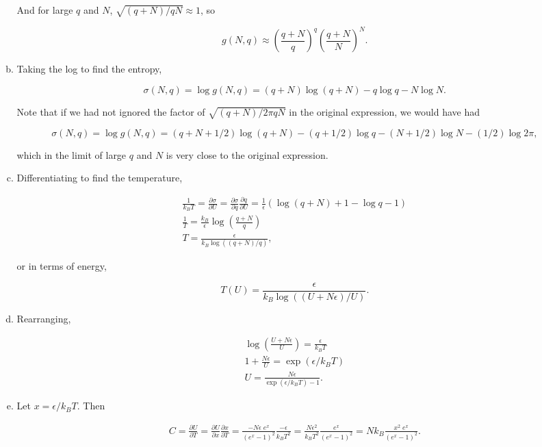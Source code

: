 \documentclass{article}
\begin{document}
\begin{enumerate}
\begin{enumerate}[(a)]
		And for large $q$ and $N$, $\sqrt{(q+N)/qN} \approx 1$, so

		$$g(N,q) \approx \left( \frac{q+N}{q} \right)^q \left( \frac{q+N}{N} \right)^N.$$

		\item

		Taking the log to find the entropy,

		$$
		\sigma(N, q) = \log g(N,q) = (q+N)\log (q+N) - q \log q - N \log N.
		$$

		Note that if we had not ignored the factor of $\sqrt{(q+N) / 2\pi qN}$ in the original expression, we would have had

		$$
		\sigma(N, q) = \log g(N,q) = (q+N + 1/2)\log (q+N) - (q + 1/2) \log q - (N + 1/2) \log N - (1/2) \log 2 \pi,
		$$

		which in the limit of large $q$ and $N$ is very close to the original expression.

		\item

		Differentiating to find the temperature,

		\begin{gather*}
		\frac{1}{k_BT} = \frac{\partial \sigma}{\partial U} = \frac{\partial \sigma}{\partial q} \frac{\partial q}{\partial U} = \frac{1}{\epsilon} \left( \log (q+N) + 1 - \log q - 1 \right) \\
		\frac{1}{T} = \frac{k_B}{\epsilon} \log \left( \frac{q+N}{q} \right) \\
		T = \frac{\epsilon}{k_B \log ((q+N) / q)},
		\end{gather*}

		or in terms of energy,

		$$T(U) = \frac{\epsilon}{k_B \log ((U + N\epsilon) / U )}.$$

		\item

		Rearranging,

		\begin{gather*}
		\log \left( \frac{U + N\epsilon} {U} \right) = \frac{\epsilon}{k_B T} \\
		1 + \frac{N\epsilon}{U} = \exp(\epsilon/k_BT) \\
		U = \frac{N\epsilon}{\exp(\epsilon/k_BT) - 1}.
		\end{gather*}

		\item

		Let $x = \epsilon / k_B T$. Then 

		\begin{gather*}
		C = \frac{\partial U}{\partial T} = \frac{\partial U}{\partial x} \frac{\partial x}{\partial T} = \frac{-N \epsilon \; e^x}{(e^x - 1)^2} \frac{-\epsilon}{k_B T^2} = \frac{N \epsilon^2}{k_B T^2} \frac{e^x}{(e^x -1)^2} = Nk_B \frac{x^2 \; e^x}{(e^x -1)^2}.
		\end{gather*}


\end{enumerate}
\end{enumerate}
\end{document}
